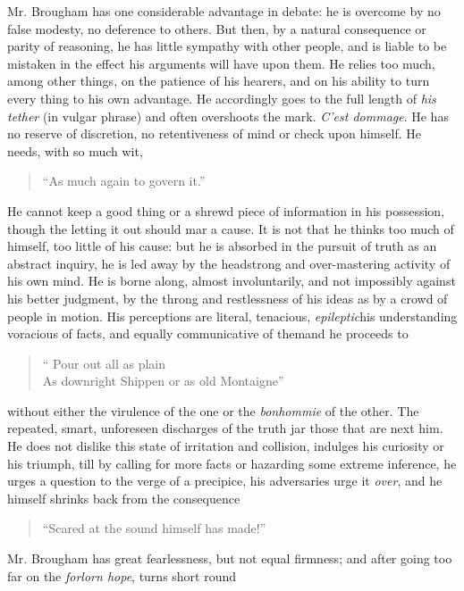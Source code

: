 Mr. Brougham has one considerable advantage in debate: he is overcome
by no false modesty, no deference to others. But then, by a natural
consequence or parity of reasoning, he has little sympathy with other
people, and is liable to be mistaken in the effect his arguments will
have upon them. He relies too much, among other things, on the patience
of his hearers, and on his ability to turn every thing to his own
advantage. He accordingly goes to the full length of \emph{his tether} (in
vulgar phrase) and often overshoots the mark. \emph{C'est dommage}. He has no
reserve of discretion, no retentiveness of mind or check upon himself.
He needs, with so much wit,
\begin{quote}
  ``As much again to govern it.''

\end{quote}
He cannot keep a good thing or a shrewd piece of information in his
possession, though the letting it out should mar a cause. It is not
that he thinks too much of himself, too little of his cause: but he is
absorbed in the pursuit of truth as an abstract inquiry, he is led away
by the headstrong and over-mastering activity of his own mind. He is
borne along, almost involuntarily, and not impossibly against his better
judgment, by the throng and restlessness of his ideas as by a crowd
of people in motion. His perceptions are literal, tenacious,
\emph{epileptic}\textemdash his understanding voracious of facts, and equally
communicative of them\textemdash and he proceeds to
\begin{verse}
  `` Pour out all as plain \\
  As downright Shippen or as old Montaigne''\textemdash

\end{verse}
without either the virulence of the one or the \emph{bonhommie} of
the other.  The repeated, smart, unforeseen discharges of the
truth jar those that are next him. He does not dislike this state
of irritation and collision, indulges his curiosity or his
triumph, till by calling for more facts or hazarding some extreme
inference, he urges a question to the verge of a precipice, his
adversaries urge it \emph{over}, and he himself shrinks back from
the consequence\textemdash
\begin{quote}
  ``Scared at the sound himself has made!''

\end{quote}
Mr. Brougham has great fearlessness, but not equal firmness; and
after going too far on the \emph{forlorn hope}, turns short round
